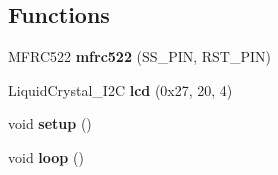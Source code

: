 \subsection*{Functions}
\begin{DoxyCompactItemize}
\item 
\mbox{\label{_kluis___v2_8ino_ac672f817299d07cc428fe3f456235273}} 
M\+F\+R\+C522 {\bfseries mfrc522} (S\+S\+\_\+\+P\+IN, R\+S\+T\+\_\+\+P\+IN)
\item 
\mbox{\label{_kluis___v2_8ino_ac21d052bacaf620de472c9d000f0be38}} 
Liquid\+Crystal\+\_\+\+I2C {\bfseries lcd} (0x27, 20, 4)
\item 
\mbox{\label{_kluis___v2_8ino_a4fc01d736fe50cf5b977f755b675f11d}} 
void {\bfseries setup} ()
\item 
\mbox{\label{_kluis___v2_8ino_afe461d27b9c48d5921c00d521181f12f}} 
void {\bfseries loop} ()
\end{DoxyCompactItemize}
